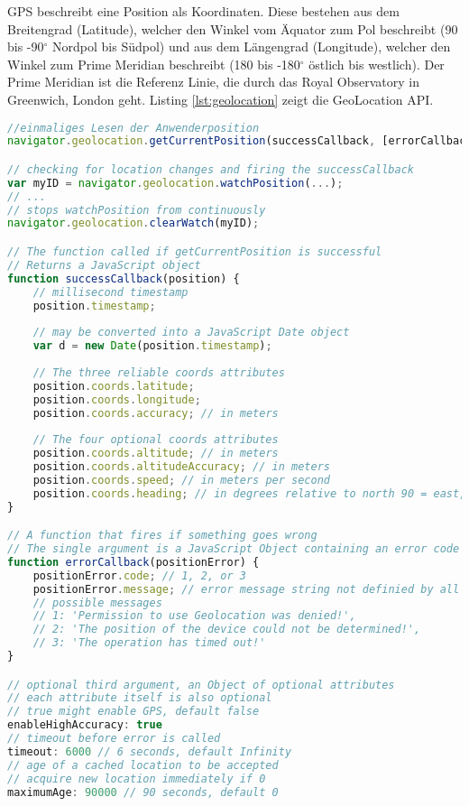 GPS beschreibt eine Position als Koordinaten. Diese bestehen aus dem Breitengrad (Latitude), welcher den Winkel vom Äquator zum Pol beschreibt (90 bis -90$^\circ$ Nordpol bis Südpol) und aus dem Längengrad (Longitude), welcher den Winkel zum Prime Meridian beschreibt (180 bis -180$^\circ$ östlich bis westlich). Der Prime Meridian ist die Referenz Linie, die durch das Royal Observatory in Greenwich, London geht. Listing \ref{lst:geolocation} zeigt die GeoLocation API.

\begin{lstlisting}[language=Javascript, caption=GeoLocation API, label=lst:geolocation]
//einmaliges Lesen der Anwenderposition 
navigator.geolocation.getCurrentPosition(successCallback, [errorCallback, positionOptions])

// checking for location changes and firing the successCallback 
var myID = navigator.geolocation.watchPosition(...);
// ...
// stops watchPosition from continuously 
navigator.geolocation.clearWatch(myID);

// The function called if getCurrentPosition is successful 
// Returns a JavaScript object
function successCallback(position) {
	// millisecond timestamp 
	position.timestamp;
	
	// may be converted into a JavaScript Date object 
	var d = new Date(position.timestamp);
	
	// The three reliable coords attributes
	position.coords.latitude;
	position.coords.longitude;
	position.coords.accuracy; // in meters
	
	// The four optional coords attributes
	position.coords.altitude; // in meters
	position.coords.altitudeAccuracy; // in meters
	position.coords.speed; // in meters per second
	position.coords.heading; // in degrees relative to north 90 = east, 180 = south
}

// A function that fires if something goes wrong 
// The single argument is a JavaScript Object containing an error code (code) and a reason (message)
function errorCallback(positionError) {
	positionError.code; // 1, 2, or 3
	positionError.message; // error message string not definied by all browsers
	// possible messages
	// 1: 'Permission to use Geolocation was denied!',
	// 2: 'The position of the device could not be determined!',
	// 3: 'The operation has timed out!'
}

// optional third argument, an Object of optional attributes
// each attribute itself is also optional
// true might enable GPS, default false 
enableHighAccuracy: true
// timeout before error is called 
timeout: 6000 // 6 seconds, default Infinity
// age of a cached location to be accepted 
// acquire new location immediately if 0 
maximumAge: 90000 // 90 seconds, default 0
\end{lstlisting}

